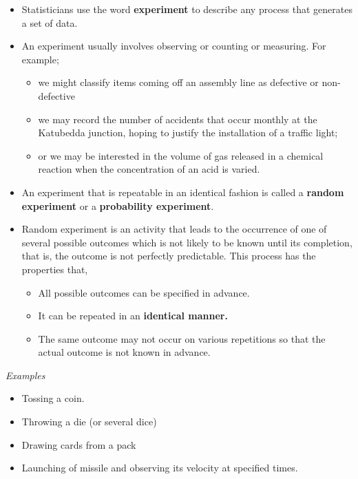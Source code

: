 \documentclass[]{book}
\providecommand{\tightlist}{%
  \setlength{\itemsep}{0pt}\setlength{\parskip}{0pt}}
\begin{document}
\begin{itemize}
\tightlist
\item
  Statisticians use the word \textbf{experiment} to describe any process that generates a set of data.
\item
  An experiment usually involves observing or counting or measuring. For example;

  \begin{itemize}
  \tightlist
  \item
    we might classify items coming off an assembly line as defective or non-defective
  \item
    we may record the number of accidents that occur monthly at the Katubedda junction, hoping to justify the installation of a traffic light;
  \item
    or we may be interested in the volume of gas released in a chemical reaction when the concentration of an acid is varied.
  \end{itemize}
\item
  An experiment that is repeatable in an identical fashion is called a \textbf{random experiment} or a \textbf{probability experiment}.
\item
  Random experiment is an activity that leads to the occurrence of one of several possible outcomes which is not likely to be known until its completion, that is, the outcome is not perfectly predictable. This process has the properties that,

  \begin{itemize}
  \tightlist
  \item
    All possible outcomes can be specified in advance.
  \item
    It can be repeated in an \textbf{identical manner.}
  \item
    The same outcome may not occur on various repetitions so that the actual outcome is not known in advance.
  \end{itemize}
\end{itemize}

\emph{Examples}

\begin{itemize}
\tightlist
\item
  Tossing a coin.
\item
  Throwing a die (or several dice)
\item
  Drawing cards from a pack
\item
  Launching of missile and observing its velocity at specified times.
\end{itemize}
\end{document}
